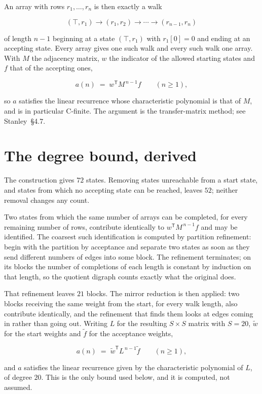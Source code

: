 \documentclass[11pt]{article}
\theoremstyle{definition}
\begin{document}
An array with rows $r_1,\dots,r_n$ is then exactly a walk

\[(\top,r_1) \to (r_1,r_2) \to \cdots \to (r_{n-1},r_n)\]

of length $n-1$ beginning at a state $(\top,r_1)$ with $r_1[0]=0$ and ending at an accepting state. Every array gives one such walk and every such walk one array. With $M$ the adjacency matrix, $w$ the indicator of the allowed starting states and $f$ that of the accepting ones,

\[a(n) \;=\; w^{\mathsf T} M^{\,n-1} f \qquad (n \ge 1),\]

so $a$ satisfies the linear recurrence whose characteristic polynomial is that of $M$, and is in particular C-finite. The argument is the transfer-matrix method; see Stanley~\S4.7.

\section{The degree bound, derived}

The construction gives $72$ states. Removing states unreachable from a start state, and states from which no accepting state can be reached, leaves $52$; neither removal changes any count.

Two states from which the same number of arrays can be completed, for every remaining number of rows, contribute identically to $w^{\mathsf T}M^{\,n-1}f$ and may be identified. The coarsest such identification is computed by partition refinement: begin with the partition by acceptance and separate two states as soon as they send different numbers of edges into some block. The refinement terminates; on its blocks the number of completions of each length is constant by induction on that length, so the quotient digraph counts exactly what the original does.

That refinement leaves $21$ blocks. The mirror reduction is then applied: two blocks receiving the same weight from the start, for every walk length, also contribute identically, and the refinement that finds them looks at edges coming in rather than going out. Writing $L$ for the resulting $S \times S$ matrix with $S = 20$, $\tilde w$ for the start weights and $\tilde f$ for the acceptance weights,

\[a(n) \;=\; \tilde w^{\mathsf T} L^{\,n-1} \tilde f \qquad (n \ge 1),\]

and $a$ satisfies the linear recurrence given by the characteristic polynomial of $L$, of degree $20$. This is the only bound used below, and it is computed, not assumed.
\end{document}
